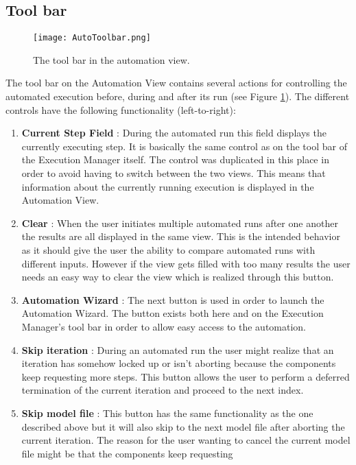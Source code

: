 \subsection{Tool bar}
\label{section:AutoToolbar}
\begin{figure}[Automation View tool bar]
  \centering
  \texttt{[image: AutoToolbar.png]}
  \caption[The tool bar in the automation view.]%
  {The tool bar in the automation view.\protect}
  \label{fig:AutoToolbar}
\end{figure}
The tool bar on the Automation View contains several actions for controlling the automated 
execution before, during and after its run (see Figure \ref{fig:AutoToolbar}).
The different controls have the following functionality (left-to-right):
\begin{enumerate}
 \item \textbf{Current Step Field} : During the automated run this field displays the
currently executing step. It is basically the same control as on the tool bar of the 
Execution Manager itself. The control was duplicated in this place in order to avoid
having to switch between the two views. This means that information about the currently
running execution is displayed in the Automation View.
 \item \textbf{Clear} : When the user initiates multiple automated runs after one another
the results are all displayed in the same view. This is the intended behavior as it should 
give the user the ability to compare automated runs with different inputs. However if the 
view gets filled with too many results the user needs an easy way to clear the view which
is realized through this button.
 \item \textbf{Automation Wizard} : The next button is used in order to launch the 
Automation Wizard. The button exists both here and on the Execution Manager's tool bar
in order to allow easy access to the automation.
 \item \textbf{Skip iteration} : During an automated run the user might realize that an
iteration has somehow locked up or isn't aborting because the components keep requesting more
steps. This button allows the user to perform a deferred termination of the current iteration
and proceed to the next index.
 \item \textbf{Skip model file} : This button has the same functionality as the one described
above but it will also skip to the next model file after aborting the current iteration. The reason
for the user wanting to cancel the current model file might be that the components keep requesting

\end{enumerate}

